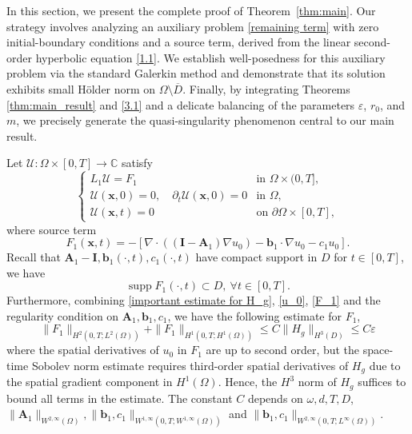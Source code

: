 \documentclass[11pt,reqno,oneside]{amsart}
\numberwithin{equation}{section}
\theoremstyle{definition}
\theoremstyle{remark}
\numberwithin{equation}{section}
\begin{document}
	In this section, we present the complete proof of Theorem~\ref{thm:main}. Our strategy involves analyzing an auxiliary problem \eqref{remaining term} with zero initial-boundary conditions and a source term, derived from the linear second-order hyperbolic equation \eqref{1.1}. We establish well-posedness for this  auxiliary problem via the standard Galerkin method and demonstrate that its solution exhibits small H\" older norm on $\Omega \setminus \overline{D}$. Finally, by integrating Theorems \ref{thm:main_result} and \ref{3.1} and a delicate balancing of the parameters $\varepsilon$, $r_0$, and $m$, we precisely generate the quasi-singularity phenomenon central to our main result.
	
	Let $\mathcal{U} : \Omega \times [0,T] \rightarrow \mathbb{C}$ satisfy 
	\begin{equation}\label{remaining term}
		\begin{cases}
			L_1\mathcal{U} = F_1 & \text{in } \Omega \times (0,T], \\
			\mathcal{U}(\mathbf{x},0) = 0, \quad \partial_t \mathcal{U}(\mathbf{x},0) = 0 & \text{in } \Omega, \\
			\mathcal{U}(\mathbf{x},t) = 0 & \text{on } \partial\Omega \times [0,T],
		\end{cases}
	\end{equation}
	where source term
	\begin{equation}\label{F_1}
		F_1(\mathbf{x}, t)=-\left[\nabla \cdot\left((\mathbf{I}-\mathbf{A}_1) \nabla u_0\right)-\mathbf{b}_1 \cdot \nabla u_0-c_1 u_0\right].
	\end{equation}
	Recall that $\mathbf{A}_1 - \mathbf{I}, \mathbf{b}_1(\cdot,t), c_1(\cdot,t)$ have compact support in $D$ for $t\in[0,T]$, we have 
	\begin{equation*}
		\operatorname{supp}F_1(\cdot,t)\subset D,\ \forall t\in [0,T].
	\end{equation*}
	Furthermore, combining \eqref{important estimate for H_g}, \eqref{u_0}, \eqref{F_1} and the regularity condition on $\mathbf{A}_1,\mathbf{b}_1,c_1$, we have the following estimate for $F_1$,
	\begin{equation}\label{estimate on F_1}
		\| F_1 \|_{H^2(0,T;L^2(\Omega))} + \| F_1 \|_{H^1(0,T;H^1(\Omega))} \leqslant C\|H_g\|_{H^3(D)} \leqslant C\varepsilon
	\end{equation}
	where the spatial derivatives of \( u_0 \) in \( F_1 \) are up to second order, but the space-time Sobolev norm estimate requires third-order spatial derivatives of \( H_g \) due to the spatial gradient component in \( H^1(\Omega) \). Hence, the \( H^3 \) norm of \( H_g \) suffices to bound all terms in the estimate. The constant $C$ depends on $\omega,d,T,D$, $\|\mathbf{A}_1\|_{W^{2,\infty}(\Omega)},\|\mathbf{b}_{1},c_1\|_{W^{1,\infty}(0,T; W^{1,\infty}(\Omega))}$ and $ \|\mathbf{b}_{1},c_1\|_{W^{2,\infty}(0,T;L^{\infty}(\Omega))}$.
	
\end{document}
